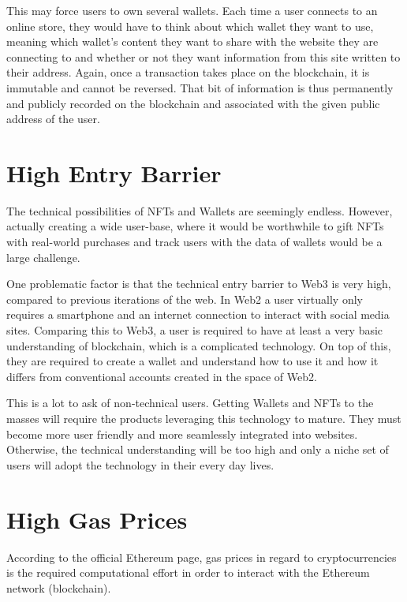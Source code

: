 This may force users to own several wallets. Each time a user connects to an online store, they would have to think about which wallet they want to use, meaning which wallet's content they want to share with the website they are connecting to and whether or not they want information from this site written to their address. Again, once a transaction takes place on the blockchain, it is immutable and cannot be reversed. That bit of information is thus permanently and publicly recorded on the blockchain and associated with the given public address of the user.


%
%
\section{High Entry Barrier}
\label{sub:results:barrier}
The technical possibilities of NFTs and Wallets are seemingly endless. However, actually creating a wide user-base, where it would be worthwhile to gift NFTs with real-world purchases and track users with the data of wallets would be a large challenge.

One problematic factor is that the technical entry barrier to Web3 is very high, compared to previous iterations of the web. In Web2 a user virtually only requires a smartphone and an internet connection to interact with social media sites. Comparing this to Web3, a user is required to have at least a very basic understanding of blockchain, which is a complicated technology. On top of this, they are required to create a wallet and understand how to use it and how it differs from conventional accounts created in the space of Web2.

This is a lot to ask of non-technical users. Getting Wallets and NFTs to the masses will require the products leveraging this technology to mature. They must become more user friendly and more seamlessly integrated into websites. Otherwise, the technical understanding will be too high and only a niche set of users will adopt the technology in their every day lives.

%
%
\section{High Gas Prices}
\label{sub:results:barrier}
According to the official Ethereum page, gas prices in regard to cryptocurrencies is the required computational effort in order to interact with the Ethereum network (blockchain). \cite{ether}

